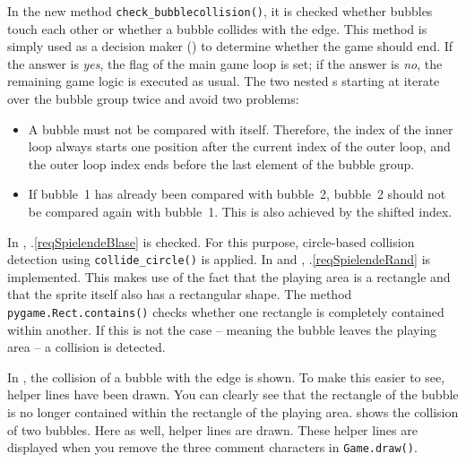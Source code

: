 In the new method \texttt{check\_\-bubble\-coll\-ision()}, it is checked whether bubbles touch each other or whether a bubble collides with the edge. This method is simply used as a decision maker () to determine whether the game should end. If the answer is \emph{yes}, the flag of the main game loop is set; if the answer is \emph{no}, the remaining game logic is executed as usual. The two nested \forSchleife s starting at  iterate over the bubble group twice and avoid two problems:

\begin{itemize}
	\item A bubble must not be compared with itself. Therefore, the index of the inner loop always starts one position after the current index of the outer loop, and the outer loop index ends before the last element of the bubble group.
	
	\item If bubble~1 has already been compared with bubble~2, bubble~2 should not be compared again with bubble~1. This is also achieved by the shifted index.
\end{itemize}



In , .\ref{reqSpielendeBlase} is checked. For this purpose, circle-based collision detection using \texttt{collide\_circle()} is applied. In  and , .\ref{reqSpielendeRand} is implemented. This makes use of the fact that the playing area is a rectangle and that the sprite itself also has a rectangular shape. The method \texttt{pygame.Rect.\-con\-tains()} checks whether one rectangle is completely contained within another. If this is not the case -- meaning the bubble leaves the playing area -- a collision is detected.


In , the collision of a bubble with the edge is shown. To make this easier to see, helper lines have been drawn. You can clearly see that the rectangle of the bubble is no longer contained within the rectangle of the playing area.  shows the collision of two bubbles. Here as well, helper lines are drawn. These helper lines are displayed when you remove the three comment characters in \texttt{Game.draw()}.

